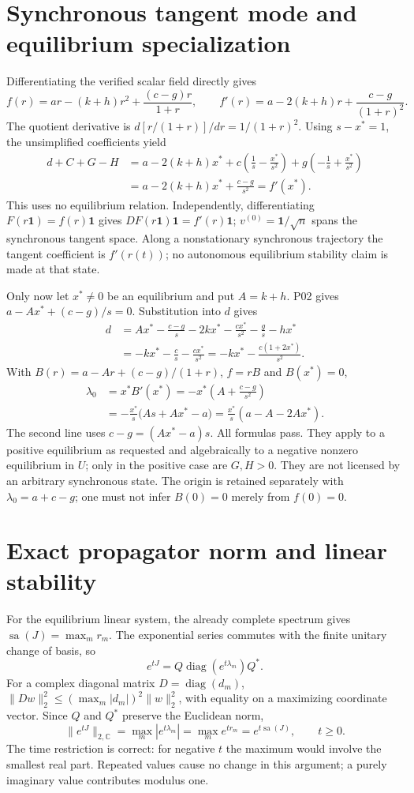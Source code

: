 \documentclass[11pt]{article}
\newcommand{\CC}{\mathbb C}
\newcommand{\one}{\mathbf 1}
\newcommand{\diag}{\operatorname{diag}}
\newcommand{\sa}{\operatorname{sa}}
\begin{document}
\section{Synchronous tangent mode and equilibrium specialization}
Differentiating the verified scalar field directly gives
\[
 f(r)=ar-(k+h)r^2+\frac{(c-g)r}{1+r},\qquad
 f'(r)=a-2(k+h)r+\frac{c-g}{(1+r)^2}.
\]
The quotient derivative is $d[r/(1+r)]/dr=1/(1+r)^2$.
Using $s-x^*=1$, the unsimplified coefficients yield
\begin{align*}
 d+C+G-H
 &=a-2(k+h)x^*+
   c\left(\frac1s-\frac{x^*}{s^2}\right)
   +g\left(-\frac1s+\frac{x^*}{s^2}\right)\\
 &=a-2(k+h)x^*+\frac{c-g}{s^2}=f'(x^*).
\end{align*}
This uses no equilibrium relation. Independently, differentiating
$F(r\one)=f(r)\one$ gives $DF(r\one)\one=f'(r)\one$;
$v^{(0)}=\one/\sqrt n$ spans the synchronous tangent space.
Along a nonstationary synchronous trajectory the tangent coefficient is
$f'(r(t))$; no autonomous equilibrium stability claim is made at that state.

Only now let $x^*\ne0$ be an equilibrium and put $A=k+h$. P02 gives
$a-Ax^*+(c-g)/s=0$. Substitution into $d$ gives
\begin{align*}
 d&=Ax^*-\frac{c-g}{s}-2kx^*-\frac{cx^*}{s^2}
                          -\frac gs-hx^*\\
  &=-kx^*-\frac cs-\frac{cx^*}{s^2}
   =-kx^*-\frac{c(1+2x^*)}{s^2}.
\end{align*}
With $B(r)=a-Ar+(c-g)/(1+r)$, $f=rB$ and $B(x^*)=0$,
\begin{align*}
 \lambda_0&=x^*B'(x^*)=-x^*\left(A+\frac{c-g}{s^2}\right)\\
 &=-\frac{x^*}{s}\bigl(As+Ax^*-a\bigr)
   =\frac{x^*}{s}(a-A-2Ax^*).
\end{align*}
The second line uses $c-g=(Ax^*-a)s$. All formulas pass. They apply to a
positive equilibrium as requested and algebraically to a negative nonzero
equilibrium in $U$; only in the positive case are $G,H>0$.
They are not licensed by an arbitrary synchronous state. The origin is
retained separately with $\lambda_0=a+c-g$; one must not infer $B(0)=0$
merely from $f(0)=0$.

\section{Exact propagator norm and linear stability}
For the equilibrium linear system, the already complete spectrum gives
$\sa(J)=\max_m r_m$. The exponential series commutes with the finite
unitary change of basis, so
\[
 e^{tJ}=Q\diag(e^{t\lambda_m})Q^*.
\]
For a complex diagonal matrix $D=\diag(d_m)$,
$\|Dw\|_2^2\le(\max_m|d_m|)^2\|w\|_2^2$, with equality on a maximizing
coordinate vector. Since $Q$ and $Q^*$ preserve the Euclidean norm,
\begin{equation}\label{eq:a04-norm}
 \|e^{tJ}\|_{2,\CC}=\max_m|e^{t\lambda_m}|
 =\max_m e^{tr_m}=e^{t\sa(J)},\qquad t\ge0.
\end{equation}
The time restriction is correct: for negative $t$ the maximum would involve
the smallest real part. Repeated values cause no change in this argument;
a purely imaginary value contributes modulus one.
\end{document}
